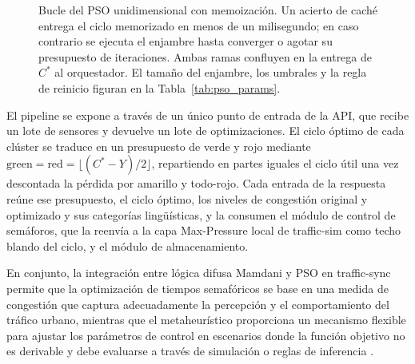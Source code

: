 \begin{figure}[ht]
\shorthandon{>}
\caption{Bucle del PSO unidimensional con memoización. Un acierto de caché entrega el ciclo memorizado en menos de un milisegundo; en caso contrario se ejecuta el enjambre hasta converger o agotar su presupuesto de iteraciones. Ambas ramas confluyen en la entrega de $C^{*}$ al orquestador. El tamaño del enjambre, los umbrales y la regla de reinicio figuran en la Tabla~\ref{tab:pso_params}.}
\label{fig:pso_memoizacion}
\end{figure}

El pipeline se expone a través de un único punto de entrada de la API, que recibe un lote de sensores y devuelve un lote de optimizaciones. El ciclo óptimo de cada clúster se traduce en un presupuesto de verde y rojo mediante $\text{green} = \text{red} = \lfloor (C^* - Y) / 2 \rfloor$, repartiendo en partes iguales el ciclo útil una vez descontada la pérdida por amarillo y todo-rojo. Cada entrada de la respuesta reúne ese presupuesto, el ciclo óptimo, los niveles de congestión original y optimizado y sus categorías lingüísticas, y la consumen el módulo de control de semáforos, que la reenvía a la capa Max-Pressure local de traffic-sim como techo blando del ciclo, y el módulo de almacenamiento.

En conjunto, la integración entre lógica difusa Mamdani y PSO en traffic-sync permite que la optimización de tiempos semafóricos se base en una medida de congestión que captura adecuadamente la percepción y el comportamiento del tráfico urbano, mientras que el metaheurístico proporciona un mecanismo flexible para ajustar los parámetros de control en escenarios donde la función objetivo no es derivable y debe evaluarse a través de simulación o reglas de inferencia \cite{ross2010fuzzy,poli2007particle}.

